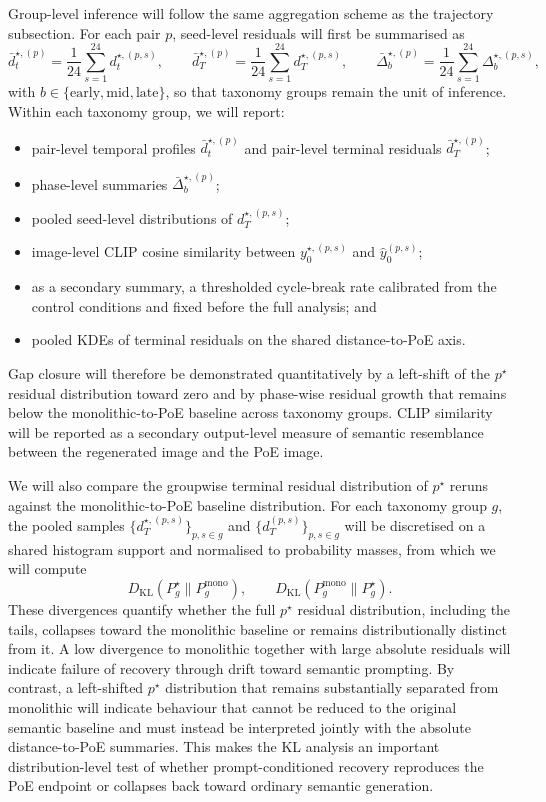 Group-level inference will follow the same aggregation scheme as the trajectory subsection. For each pair $p$, seed-level residuals will first be summarised as
\[
\bar d_t^{\star,(p)} = \frac{1}{24}\sum_{s=1}^{24} d_t^{\star,(p,s)}, \qquad
\bar d_T^{\star,(p)} = \frac{1}{24}\sum_{s=1}^{24} d_T^{\star,(p,s)}, \qquad
\bar\Delta_{b}^{\star,(p)} = \frac{1}{24}\sum_{s=1}^{24} \Delta_{b}^{\star,(p,s)},
\]
with $b \in \{\mathrm{early},\mathrm{mid},\mathrm{late}\}$, so that taxonomy groups remain the unit of inference. Within each taxonomy group, we will report:
\begin{itemize}
    \item pair-level temporal profiles $\bar d_t^{\star,(p)}$ and pair-level terminal residuals $\bar d_T^{\star,(p)}$;
    \item phase-level summaries $\bar\Delta_b^{\star,(p)}$;
    \item pooled seed-level distributions of $d_T^{\star,(p,s)}$;
    \item image-level CLIP cosine similarity between $y_0^{\star,(p,s)}$ and $\hat y_0^{(p,s)}$;
    \item as a secondary summary, a thresholded cycle-break rate calibrated from the control conditions and fixed before the full analysis; and
    \item pooled KDEs of terminal residuals on the shared distance-to-PoE axis.
\end{itemize}
Gap closure will therefore be demonstrated quantitatively by a left-shift of the $p^\star$ residual distribution toward zero and by phase-wise residual growth that remains below the monolithic-to-PoE baseline across taxonomy groups. 
CLIP similarity will be reported as a secondary output-level measure of semantic resemblance between the regenerated image and the PoE image.

We will also compare the groupwise terminal residual distribution of $p^\star$ reruns against the monolithic-to-PoE baseline distribution. 
For each taxonomy group $g$, the pooled samples $\{d_T^{\star,(p,s)}\}_{p,s \in g}$ and $\{d_T^{(p,s)}\}_{p,s \in g}$ will be discretised on a shared histogram support and normalised to probability masses, from which we will compute
\[
D_{\mathrm{KL}}(P_g^{\star}\|P_g^{\mathrm{mono}}), \qquad
D_{\mathrm{KL}}(P_g^{\mathrm{mono}}\|P_g^{\star}).
\]
These divergences quantify whether the full $p^\star$ residual distribution, including the tails, collapses toward the monolithic baseline or remains distributionally distinct from it. 
A low divergence to monolithic together with large absolute residuals will indicate failure of recovery through drift toward semantic prompting. By contrast, a left-shifted $p^\star$ distribution that remains substantially separated from monolithic will indicate behaviour that cannot be reduced to the original semantic baseline and must instead be interpreted jointly with the absolute distance-to-PoE summaries. This makes the KL analysis an important distribution-level test of whether prompt-conditioned recovery reproduces the PoE endpoint or collapses back toward ordinary semantic generation.

